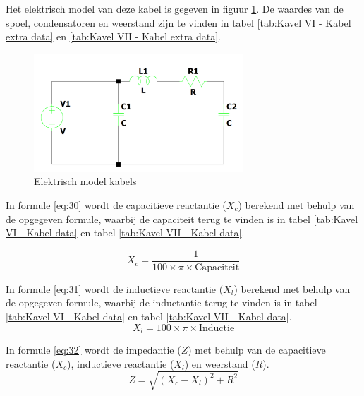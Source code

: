 Het elektrisch model van deze kabel is gegeven in figuur \ref{fig:elektrischmodel}. De waardes van de spoel, condensatoren en weerstand zijn te vinden in tabel \ref{tab:Kavel VI - Kabel extra data} en \ref{tab:Kavel VII - Kabel extra data}.

\begin{figure}[H]
\centering
\includegraphics[width=0.7\textwidth]{IMG/data/overzicht/elektrischmodel_kabel.png}
\caption{Elektrisch model kabels}
\label{fig:elektrischmodel}
\end{figure}

In formule \ref{eq:30} wordt de capacitieve reactantie (\(X_c\)) berekend met behulp van de opgegeven formule, waarbij de capaciteit terug te vinden is in tabel \ref{tab:Kavel VI - Kabel data} en tabel \ref{tab:Kavel VII - Kabel data}.

\begin{equation} \label{eq:30}
X_c = \frac{1}{{100 \times \pi \times \text{{Capaciteit}}}}
\end{equation}

In formule \ref{eq:31} wordt de inductieve reactantie (\(X_l\)) berekend met behulp van de opgegeven formule, waarbij de inductantie terug te vinden is in tabel \ref{tab:Kavel VI - Kabel data} en tabel \ref{tab:Kavel VII - Kabel data}.
\begin{equation} \label{eq:31}
X_l = 100 \times \pi \times \text{{Inductie}}
\end{equation}

In formule \ref{eq:32} wordt de impedantie (\(Z\)) met behulp van de capacitieve reactantie (\(X_c\)), inductieve reactantie (\(X_l\)) en weerstand (\(R\)).
\begin{equation} \label{eq:32}
Z = \sqrt{{(X_c - X_l)^2 + R^2}}
\end{equation}


